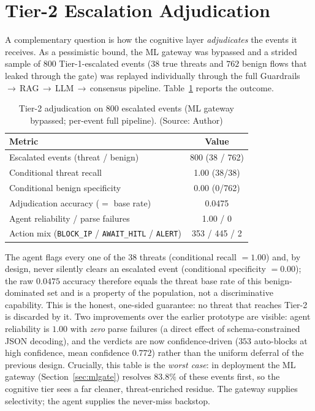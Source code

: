 \section{Tier-2 Escalation Adjudication}
A complementary question is how the cognitive layer \emph{adjudicates} the events it receives. As a pessimistic bound, the ML gateway was bypassed and a strided sample of $800$ Tier-1-escalated events ($38$ true threats and $762$ benign flows that leaked through the gate) was replayed individually through the full Guardrails\,$\rightarrow$\,RAG\,$\rightarrow$\,LLM\,$\rightarrow$\,consensus pipeline. Table~\ref{tab:tier2adjudication} reports the outcome.

\begin{table}[!htbp]
    \centering
    \caption{Tier-2 adjudication on $800$ escalated events (ML gateway bypassed; per-event full pipeline). (Source: Author)}
    \label{tab:tier2adjudication}
    \begin{tabular}{|l|c|}
        \hline
        \textbf{Metric} & \textbf{Value} \\ \hline
        Escalated events (threat / benign) & 800 (38 / 762) \\ \hline
        Conditional threat recall & 1.00 (38/38) \\ \hline
        Conditional benign specificity & 0.00 (0/762) \\ \hline
        Adjudication accuracy ($=$ base rate) & 0.0475 \\ \hline
        Agent reliability / parse failures & 1.00 / 0 \\ \hline
        Action mix (\texttt{BLOCK\_IP} / \texttt{AWAIT\_HITL} / \texttt{ALERT}) & 353 / 445 / 2 \\ \hline
    \end{tabular}
\end{table}

The agent flags every one of the $38$ threats (conditional recall $=1.00$) and, by design, never silently clears an escalated event (conditional specificity $=0.00$); the raw $0.0475$ accuracy therefore equals the threat base rate of this benign-dominated set and is a property of the population, not a discriminative capability. This is the honest, one-sided guarantee: no threat that reaches Tier-2 is discarded by it. Two improvements over the earlier prototype are visible: agent reliability is $1.00$ with \emph{zero} parse failures (a direct effect of schema-constrained JSON decoding), and the verdicts are now confidence-driven ($353$ auto-blocks at high confidence, mean confidence $0.772$) rather than the uniform deferral of the previous design. Crucially, this table is the \emph{worst case}: in deployment the ML gateway (Section~\ref{sec:mlgate}) resolves $83.8\%$ of these events first, so the cognitive tier sees a far cleaner, threat-enriched residue. The gateway supplies selectivity; the agent supplies the never-miss backstop.

